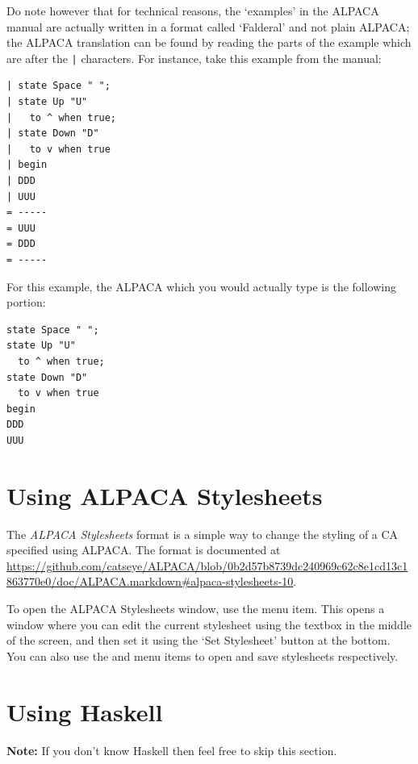 \documentclass[oneside,a4paper]{memoir}
\begin{document}
Do note however that for technical reasons\footnotemark,
  the `examples' in the ALPACA manual are actually written in a format called `Falderal' and not plain ALPACA;
  the ALPACA translation can be found by reading the parts of the example which are after the \texttt{|} characters.
For instance, take this example from the manual:

\begin{verbatim}
| state Space " ";
| state Up "U"
|   to ^ when true;
| state Down "D"
|   to v when true
| begin
| DDD
| UUU
= -----
= UUU
= DDD
= -----
\end{verbatim}

For this example, the ALPACA which you would actually type is the following portion:

\begin{verbatim}
state Space " ";
state Up "U"
  to ^ when true;
state Down "D"
  to v when true
begin
DDD
UUU
\end{verbatim}


\section{Using ALPACA Stylesheets}
\label{sec:stys}

The \emph{ALPACA Stylesheets} format is a simple way to change the styling of a CA specified using ALPACA.
The format is documented at \url{https://github.com/catseye/ALPACA/blob/0b2d57b8739dc240969c62c8e1cd13c1863770e0/doc/ALPACA.markdown#alpaca-stylesheets-10}.

To open the ALPACA Stylesheets window, use the  menu item.
This opens a window where you can edit the current stylesheet using the textbox in the middle of the screen,
  and then set it using the `Set Stylesheet' button at the bottom.
You can also use the  and  menu items to open and save stylesheets respectively.

\section{Using Haskell}
\label{sec:ushs}

\textbf{Note:} If you don't know Haskell then feel free to skip this section.

\vspace{2ex}
\end{document}

